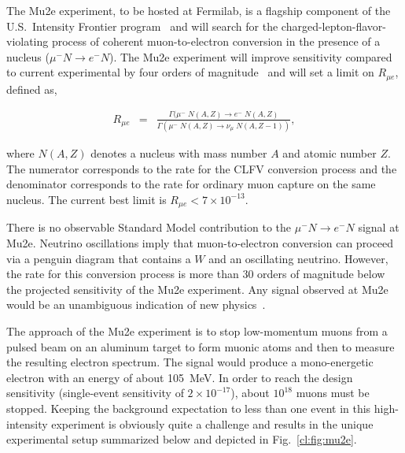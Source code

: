 

\label{cl:sec:mu2e}

The Mu2e experiment, to be hosted at Fermilab, is a flagship component
of the U.S.\ Intensity Frontier program~\cite{IF_review} and will
search for the charged-lepton-flavor-violating process of coherent
muon-to-electron conversion in the presence of a nucleus ($\mu^-N
\rightarrow e^-N$).  The Mu2e experiment will improve sensitivity
compared to current experimental by four orders of
magnitude~\cite{Mu2eCDR} and will set a limit on $R_{\mu e}$, defined
as,

%
\begin{eqnarray}
  R_{\mu e} &=& \frac
  {\Gamma(\mu^{-}\;  N(A,Z) \to e^{-}\; N(A,Z)}  {\Gamma(\mu^{-}\; N(A,Z)\to \nu_{\mu}\; N(A,Z-1))},\end{eqnarray}
%

where $N(A,Z)$ denotes a nucleus with mass number $A$ and atomic
number $Z$.  The numerator corresponds to the rate for the CLFV
conversion process and the denominator corresponds to the rate for
ordinary muon capture on the same nucleus.  The current best limit is
$R_{\mu{}e}<7\times10^{-13}$\cite{Bertl:2006up}.

There is no observable Standard Model contribution to the $\mu^-N
\rightarrow e^-N$ signal at Mu2e.  Neutrino oscillations imply that
muon-to-electron conversion can proceed via a penguin diagram that
contains a $W$ and an oscillating neutrino. However, the rate for this
conversion process is more than 30 orders of magnitude below the
projected sensitivity of the Mu2e experiment.  Any signal observed at
Mu2e would be an unambiguous indication of new
physics~\cite{Marciano:2008zz,deGouvea:2013zba}.

The approach of the Mu2e experiment is to stop low-momentum muons from
a pulsed beam on an aluminum target to form muonic atoms and then to
measure the resulting electron spectrum.  The signal would produce a
mono-energetic electron with an energy of about 105~MeV.  In order to
reach the design sensitivity (single-event sensitivity of $2\times
10^{-17}$), about $10^{18}$ muons must be stopped.  Keeping the
background expectation to less than one event in this high-intensity
experiment is obviously quite a challenge and results in the unique
experimental setup summarized below and depicted in
Fig.~\ref{cl:fig:mu2e}.

